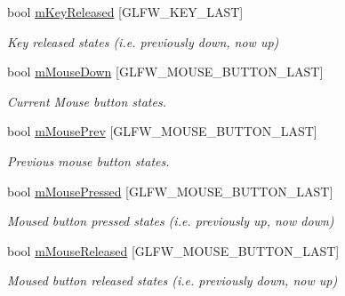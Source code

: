 \begin{DoxyCompactItemize}
bool \mbox{\hyperlink{class_input_system_aabf86f9a2e9ca112ee4a794d62e63d8d}{m\+Key\+Released}} \mbox{[}G\+L\+F\+W\+\_\+\+K\+E\+Y\+\_\+\+L\+A\+ST\mbox{]}
\begin{DoxyCompactList}\small\item\em Key released states (i.\+e. previously down, now up) \end{DoxyCompactList}\item 
\mbox{\label{class_input_system_ae0cba198a2b2dce3f1d5e4cb3e7ef50d}} 
bool \mbox{\hyperlink{class_input_system_ae0cba198a2b2dce3f1d5e4cb3e7ef50d}{m\+Mouse\+Down}} \mbox{[}G\+L\+F\+W\+\_\+\+M\+O\+U\+S\+E\+\_\+\+B\+U\+T\+T\+O\+N\+\_\+\+L\+A\+ST\mbox{]}
\begin{DoxyCompactList}\small\item\em Current Mouse button states. \end{DoxyCompactList}\item 
\mbox{\label{class_input_system_ab7e824a8e0add445f9a25fe0540aa277}} 
bool \mbox{\hyperlink{class_input_system_ab7e824a8e0add445f9a25fe0540aa277}{m\+Mouse\+Prev}} \mbox{[}G\+L\+F\+W\+\_\+\+M\+O\+U\+S\+E\+\_\+\+B\+U\+T\+T\+O\+N\+\_\+\+L\+A\+ST\mbox{]}
\begin{DoxyCompactList}\small\item\em Previous mouse button states. \end{DoxyCompactList}\item 
\mbox{\label{class_input_system_a6c1e27e4e82f9852fa914787a3aeadf7}} 
bool \mbox{\hyperlink{class_input_system_a6c1e27e4e82f9852fa914787a3aeadf7}{m\+Mouse\+Pressed}} \mbox{[}G\+L\+F\+W\+\_\+\+M\+O\+U\+S\+E\+\_\+\+B\+U\+T\+T\+O\+N\+\_\+\+L\+A\+ST\mbox{]}
\begin{DoxyCompactList}\small\item\em Moused button pressed states (i.\+e. previously up, now down) \end{DoxyCompactList}\item 
\mbox{\label{class_input_system_af4ab8aef06c733ac739401d43e938304}} 
bool \mbox{\hyperlink{class_input_system_af4ab8aef06c733ac739401d43e938304}{m\+Mouse\+Released}} \mbox{[}G\+L\+F\+W\+\_\+\+M\+O\+U\+S\+E\+\_\+\+B\+U\+T\+T\+O\+N\+\_\+\+L\+A\+ST\mbox{]}
\begin{DoxyCompactList}\small\item\em Moused button released states (i.\+e. previously down, now up) \end{DoxyCompactList}\item 

\end{DoxyCompactItemize}
